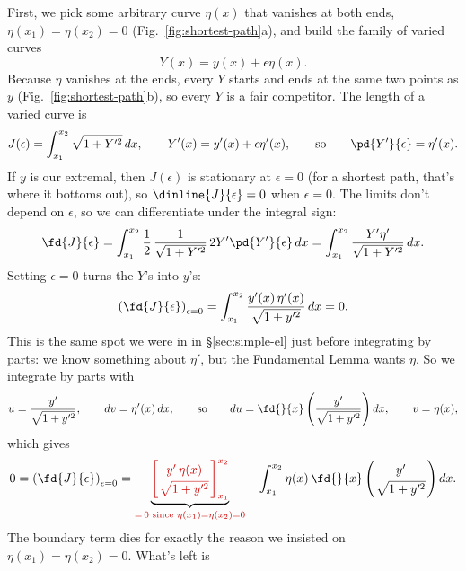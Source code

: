 \documentclass[12pt]{article}
\numberwithin{equation}{section}
\begin{document}
First, we pick some arbitrary curve \textcolor{etablue}{$\eta(x)$}
that vanishes at both ends, \textcolor{etablue}{$\eta(x_1) =
  \eta(x_2) = 0$} (Fig.~\ref{fig:shortest-path}a), and build the
family of varied curves
\begin{equation}
  Y(x) = y(x) + \epsilon\eta(x).
\end{equation}
Because $\eta$ vanishes at the ends, every $Y$ starts and ends at the
same two points as $y$ (Fig.~\ref{fig:shortest-path}b), so every $Y$
is a fair competitor. The length of a varied curve is
\begin{equation}
  J(\epsilon) = \int_{x_1}^{x_2}\sqrt{1+Y'^2}\,dx,
  \qquad Y'(x) = y'(x) + \epsilon\eta'(x),
  \qquad\textrm{so}\qquad \pd{Y'}{\epsilon} = \eta'(x).
\end{equation}
If $y$ is our extremal, then $J(\epsilon)$ is stationary at $\epsilon=0$
(for a shortest path, that's where it bottoms out), so $\dinline{J}{\epsilon}=0$ when $\epsilon=0$. The
limits don't depend on $\epsilon$, so we can differentiate under the
integral sign:
\begin{equation}
  \fd{J}{\epsilon}
  = \int_{x_1}^{x_2}\frac{1}{2}\,\frac{1}{\sqrt{1+Y'^2}}\,2Y'\pd{Y'}{\epsilon}\,dx
  = \int_{x_1}^{x_2}\frac{Y'\eta'}{\sqrt{1+Y'^2}}\,dx .
\end{equation}
Setting $\epsilon=0$ turns the $Y$'s into $y$'s:
\begin{equation}
  \label{eq:short-de}
  \left(\fd{J}{\epsilon}\right)_{\epsilon=0}
  = \int_{x_1}^{x_2}\frac{y'(x)\,\eta'(x)}{\sqrt{1+y'^2}}\,dx = 0 .
\end{equation}
This is the same spot we were in in \S\ref{sec:simple-el} just before
integrating by parts: we know
something about $\eta'$, but the Fundamental Lemma wants $\eta$. So we
integrate by parts with
\begin{equation*}
  u = \frac{y'}{\sqrt{1+y'^2}}, \qquad dv = \eta'(x)\,dx,
  \qquad\textrm{so}\qquad
  du = \fd{}{x}\left(\frac{y'}{\sqrt{1+y'^2}}\right)dx, \qquad v = \eta(x),
\end{equation*}
which gives
\begin{equation}
  0 = \left(\fd{J}{\epsilon}\right)_{\epsilon=0}
  = \underbrace{\textcolor{deadred}{\left[\frac{y'\,\eta(x)}{\sqrt{1+y'^2}}\right]_{x_1}^{x_2}}}_{\textcolor{deadred}{=\,0\textrm{ since }\eta(x_1)=\eta(x_2)=0}}
  - \int_{x_1}^{x_2}\eta(x)\,\fd{}{x}\left(\frac{y'}{\sqrt{1+y'^2}}\right)dx .
\end{equation}
The boundary term dies for exactly the reason we insisted on
$\eta(x_1)=\eta(x_2)=0$. What's left is
\end{document}
